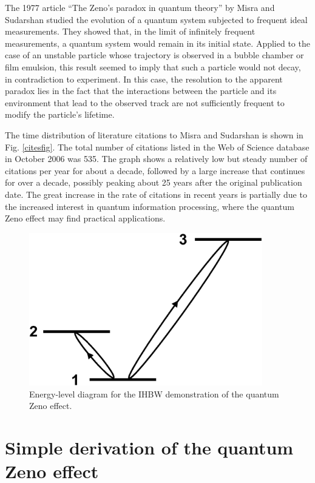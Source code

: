 \documentclass[letterpaper]{jpconf}
\begin{document}
The 1977 article ``The Zeno's paradox in quantum theory'' by Misra
and Sudarshan \cite{misra77} studied the evolution of a quantum
system subjected to frequent ideal measurements. They showed that,
in the limit of infinitely frequent measurements, a quantum system
would remain in its initial state.  Applied to the case of an
unstable particle whose trajectory is observed in a bubble chamber
or film emulsion, this result seemed to imply that such a particle
would not decay, in contradiction to experiment. In this case, the
resolution to the apparent paradox lies in the fact that the
interactions between the particle and its environment that lead to
the observed track are not sufficiently frequent to modify the
particle's lifetime.


The time distribution of literature citations to Misra and Sudarshan
\cite{misra77} is shown in Fig. \ref{citesfig}.  The total number of
citations listed in the Web of Science database in October 2006 was
535.  The graph shows a relatively low but steady number of
citations per year for about a decade, followed by a large increase
that continues for over a decade, possibly peaking about 25 years
after the original publication date.  The great increase in the rate
of citations in recent years is partially due to the increased
interest in quantum information processing, where the quantum Zeno
effect may find practical applications.

\begin{figure}[hbt]
\begin{center}
\includegraphics[width=4in]{3level2.eps}
\end{center}
\caption{\label{3levelfig}Energy-level diagram for the IHBW
demonstration of the quantum Zeno effect.}
\end{figure}



\section{Simple derivation of the quantum Zeno effect}
\end{document}
